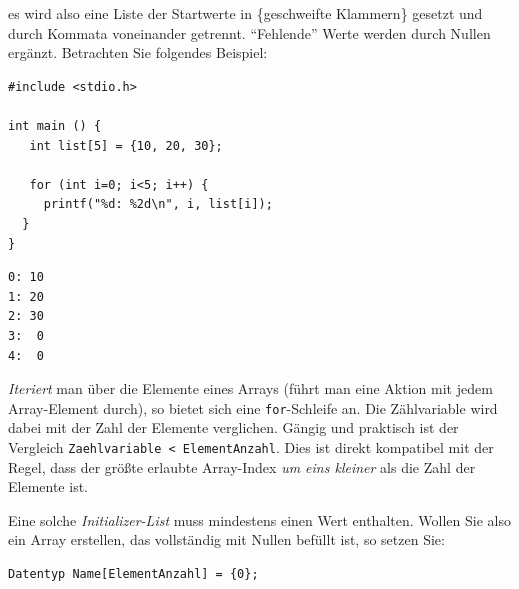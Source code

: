es wird also eine Liste der Startwerte in \{geschweifte Klammern\} gesetzt und durch Kommata voneinander getrennt. \enquote{Fehlende} Werte werden durch Nullen ergänzt. Betrachten Sie folgendes Beispiel:

\begin{codebox}
\begin{verbatim}
#include <stdio.h>

int main () {
   int list[5] = {10, 20, 30};
   
   for (int i=0; i<5; i++) {
     printf("%d: %2d\n", i, list[i]);
  }
}
\end{verbatim}
\end{codebox}

\begin{cmdbox}
\begin{verbatim}
0: 10
1: 20
2: 30
3:  0
4:  0
\end{verbatim}
\end{cmdbox}

\begin{hintbox}
\emph{Iteriert} man über die Elemente eines Arrays (\ie führt man eine Aktion mit jedem Array-Element durch), so bietet sich eine \texttt{for}-Schleife an. Die Zählvariable wird dabei mit der Zahl der Elemente verglichen. Gängig und praktisch ist der Vergleich \texttt{Zaehlvariable < ElementAnzahl}. Dies ist direkt kompatibel mit der Regel, dass der größte erlaubte Array-Index \emph{um eins kleiner} als die Zahl der Elemente ist.
\end{hintbox}

Eine solche \emph{Initializer-List} muss mindestens einen Wert enthalten. Wollen Sie also ein Array erstellen, das vollständig mit Nullen befüllt ist, so setzen Sie:

\begin{codebox}
\begin{verbatim}
Datentyp Name[ElementAnzahl] = {0};
\end{verbatim}
\end{codebox}

